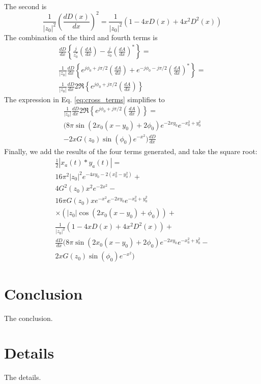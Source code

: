 \documentclass[amsmath,amssymb,aps,prd,10pt,twocolumn,showkeys]{revtex4}
\begin{document}
\begin{itemize}
\begin{multline}
\end{multline}
The second is
\begin{equation}
\frac{1}{|z_0|^2}\left(\frac{dD(x)}{dx}\right)^2 = \frac{1}{|z_0|^2}\left(1-4xD(x)+4x^2D^2(x) \right)
\end{equation}
The combination of the third and fourth terms is
\begin{multline}
\frac{dD}{dx}\left\lbrace \frac{j}{z_0^{*}} \left(\frac{dA}{dx}\right) - \frac{j}{z_0} \left(\frac{dA}{dx}\right)^{*}\right\rbrace = \\
\frac{1}{|z_0|}\frac{dD}{dx}\left\lbrace e^{j\phi_0+j\pi/2} \left(\frac{dA}{dx}\right) + e^{-j\phi_0-j\pi/2} \left(\frac{dA}{dx}\right)^{*}\right\rbrace = \\ 
\frac{1}{|z_0|}\frac{dD}{dx}2\Re\left\lbrace e^{j\phi_0+j\pi/2} \left(\frac{dA}{dx}\right) \right\rbrace \label{eq:cross_terms}
\end{multline}
The expression in Eq. \ref{eq:cross_terms} simplifies to
\begin{multline}
\frac{1}{|z_0|}\frac{dD}{dx}2\Re\left\lbrace e^{j\phi_0+j\pi/2} \left(\frac{dA}{dx}\right) \right\rbrace = \\
(8\pi\sin(2x_0(x-y_0)+2\phi_0)e^{-2xy_0}e^{-x_0^2+y_0^2} \\ -2xG(z_0)\sin(\phi_0) e^{-x^2})\frac{dD}{dx}
\end{multline}
Finally, we add the results of the four terms generated, and take the square root:
\begin{multline}
\frac{1}{2}| x_a (t) * y_a(t)| = \\
16\pi^2|z_0|^2 e^{-4x y_0 - 2(x_0^2-y_0^2)} + \\ 4G^2(z_0)x^2 e^{-2x^2} - \\ 16\pi G(z_0) x e^{-x^2}e^{-2xy_0} e^{-x_0^2+y_0^2} \\ \times \left(|z_0|\cos(2x_0(x-y_0)+\phi_0) \right) + \\
\frac{1}{|z_0|^2}\left(1-4xD(x)+4x^2D^2(x) \right) + \\
\frac{dD}{dx}(8\pi\sin(2x_0(x-y_0)+2\phi_0)e^{-2xy_0}e^{-x_0^2+y_0^2} - \\ 2xG(z_0)\sin(\phi_0) e^{-x^2})
\end{multline}
\end{itemize}

\section{Conclusion}
\label{sec:conc}

The conclusion.

\appendix

\section{Details}
\label{app:a}

The details.


\end{document}
